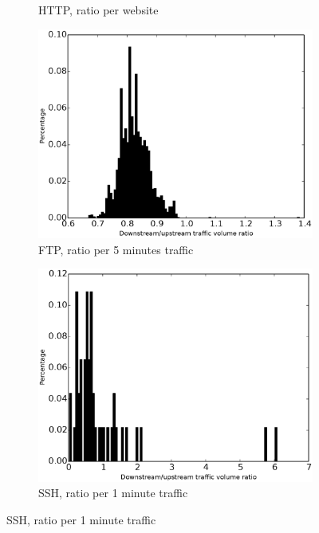 \begin{figure}
\begin{subfigure}{0.16\linewidth}
\caption{HTTP, ratio per website}
\label{fig:ratio_downstream_upstream_traffic_volume_http}
\end{subfigure}
\begin{subfigure}{0.16\linewidth}
\includegraphics[width=\linewidth]{image/ratio_downstream_upstream_traffic_volume_ftp.eps}
\caption{FTP, ratio per 5 minutes traffic}
\label{ratio_downstream_upstream_traffic_volume_ftp}
\end{subfigure}
\begin{subfigure}{0.16\linewidth}
\includegraphics[width=\linewidth]{image/ratio_downstream_upstream_traffic_volume_ssh.eps}
\caption{SSH, ratio per 1 minute traffic}
\label{ratio_downstream_upstream_traffic_volume_ssh}

\end{subfigure}
\end{figure}
